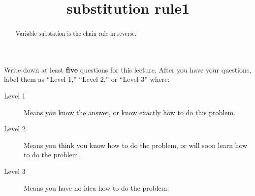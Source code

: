 \documentclass{ximera}
\title{substitution rule1}
\begin{document}
\begin{abstract}
  Variable substation is the chain rule in reverse.
\end{abstract}

\maketitle




Write down at least \textbf{five} questions for this lecture. After
you have your questions, label them as ``Level 1,'' ``Level 2,'' or ``Level 3'' where:
\begin{description}
\item[Level 1] Means you know the answer, or know exactly how to do this problem.
\item[Level 2] Means you think you know how to do the problem, or will soon learn how to do the problem.
\item[Level 3] Means you have no idea how to do the problem. 
\end{description}
\begin{question}
  \begin{freeResponse}
  \end{freeResponse}
\end{question}
\end{document}
